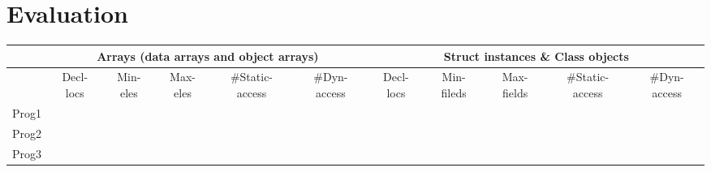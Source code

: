 \section{Evaluation}


\begin{table*}[]
    \begin{tabular}{|c|c|c|c|c|c|c|c|c|c|c|}
        \hline
              & \multicolumn{5}{c|}{Arrays (data arrays and object arrays)} & \multicolumn{5}{c|}{Struct instances \& Class objects}                                                                                                                    \\ \hline
              & Decl-locs                                                   & Min-eles                                               & Max-eles & \#Static-access & \#Dyn-access & Decl-locs & Min-fileds & Max-fields & \#Static-access & \#Dyn-access \\ \hline
        Prog1 &                                                             &                                                        &          &                 &              &           &            &            &                 &              \\ \hline
        Prog2 &                                                             &                                                        &          &                 &              &           &            &            &                 &              \\ \hline
        Prog3 &                                                             &                                                        &          &                 &              &           &            &            &                 &              \\ \hline
    \end{tabular}
\end{table*}
